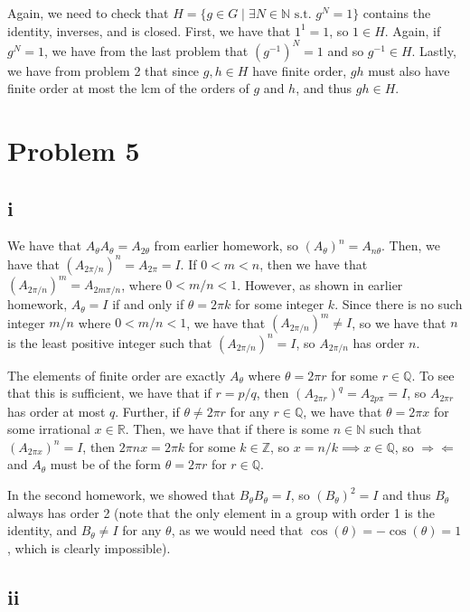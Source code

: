 \documentclass[12pt,letterpaper]{article}
\theoremstyle{definition}
\newcommand{\contra}{\Rightarrow\!\Leftarrow}
\newcommand{\R}{\mathbb{R}}
\newcommand{\Z}{\mathbb{Z}}
\newcommand{\N}{\mathbb{N}}
\newcommand{\Q}{\mathbb{Q}}
\begin{document}
Again, we need to check that $H = \{g \in G \mid \exists N \in \N \text{ s.t. } g^{N} = 1\}$ contains the identity, inverses, and is closed. First, we have that $1^{1} = 1$, so $1 \in H$. Again, if $g^{N} = 1$, we have from the last problem that $(g^{-1})^{N} = 1$ and so $g^{-1} \in H$. Lastly, we have from problem 2 that since $g,h \in H$ have finite order, $gh$ must also have finite order at most the lcm of the orders of $g$ and $h$, and thus $gh \in H$.

\section*{Problem 5}

\subsection*{i}

We have that $A_{\theta}A_{\theta} = A_{2\theta}$ from earlier homework, so $(A_{\theta})^{n} = A_{n\theta}$. Then, we have that $(A_{2\pi / n})^{n} = A_{2\pi} = I$. If $0 < m < n$, then we have that $(A_{2\pi/n})^{m} = A_{2m\pi/n}$, where $0 < m/n < 1$. However, as shown in earlier homework, $A_{\theta} = I$ if and only if $\theta = 2\pi k$ for some integer $k$. Since there is no such integer $m/n$ where $0 < m/n < 1$, we have that $(A_{2\pi /n})^{m} \neq I$, so we have that $n$ is the least positive integer such that $(A_{2\pi / n})^{n} = I$, so $A_{2\pi / n}$ has order $n$.

The elements of finite order are exactly $A_{\theta}$ where $\theta = 2\pi r$ for some $r \in \Q$. To see that this is sufficient, we have that if $r = p / q$, then $(A_{2\pi r})^{q} = A_{2 p \pi} = I$, so $A_{2\pi r}$ has order at most $q$. Further, if $\theta \neq 2\pi r$ for any $r \in \Q$, we have that $\theta = 2\pi x$ for some irrational $x \in \R$. Then, we have that if there is some $n \in \N$ such that $(A_{2\pi x})^{n} = I$, then $2\pi nx = 2\pi k$ for some $k \in \Z$, so $x = n / k \implies x \in \Q$, so $\contra$ and $A_{\theta}$ must be of the form $\theta = 2\pi r$ for $r \in \Q$.

In the second homework, we showed that $B_{\theta}B_{\theta} = I$, so $(B_{\theta})^{2} = I$ and thus $B_{\theta}$ always has order 2 (note that the only element in a group with order 1 is the identity, and $B_{\theta} \neq I$ for any $\theta$, as we would need that $\cos(\theta) = -\cos(\theta) = 1$, which is clearly impossible).

\subsection*{ii}
\end{document}
